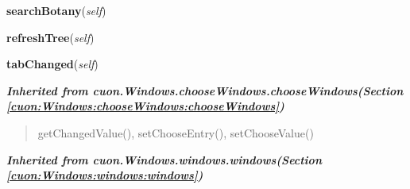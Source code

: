     \vspace{0.5ex}

\hspace{.8\funcindent}\begin{boxedminipage}{\funcwidth}

    \raggedright \textbf{searchBotany}(\textit{self})

\setlength{\parskip}{2ex}
\setlength{\parskip}{1ex}
    \end{boxedminipage}

    \label{cuon:Garden:botany:botanywindow:refreshTree}

    \vspace{0.5ex}

\hspace{.8\funcindent}\begin{boxedminipage}{\funcwidth}

    \raggedright \textbf{refreshTree}(\textit{self})

\setlength{\parskip}{2ex}
\setlength{\parskip}{1ex}
    \end{boxedminipage}

    \label{cuon:Garden:botany:botanywindow:tabChanged}

    \vspace{0.5ex}

\hspace{.8\funcindent}\begin{boxedminipage}{\funcwidth}

    \raggedright \textbf{tabChanged}(\textit{self})

\setlength{\parskip}{2ex}
\setlength{\parskip}{1ex}
    \end{boxedminipage}


\large{\textbf{\textit{Inherited from cuon.Windows.chooseWindows.chooseWindows\textit{(Section \ref{cuon:Windows:chooseWindows:chooseWindows})}}}}

\begin{quote}
getChangedValue(), setChooseEntry(), setChooseValue()
\end{quote}

\large{\textbf{\textit{Inherited from cuon.Windows.windows.windows\textit{(Section \ref{cuon:Windows:windows:windows})}}}}

